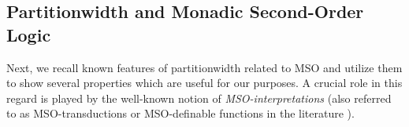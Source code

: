 %			
%
%





\subsection{Partitionwidth and Monadic Second-Order Logic}


Next, we recall known features of partitionwidth related to MSO and utilize them to show several properties which are useful for our purposes. A crucial role in this regard is played by the well-known notion of \emph{MSO-interpretations} 
(also referred to as MSO-transductions or MSO-definable functions in the literature \cite{ArnborgLS88,Courcelle91a,Engelfriet90,Courcelle94,CourEngBook}). 

